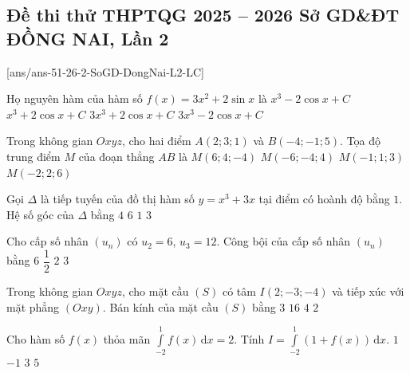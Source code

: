 \subsection*{Đề thi thử THPTQG 2025 -- 2026 Sở GD\&ĐT ĐỒNG NAI, Lần 2}
\caulc
{}[ans/ans-51-26-2-SoGD-DongNai-L2-LC]
\begin{ex}%
	Họ nguyên hàm của hàm số $f(x)=3x^2+2\sin x$ là
	\choice
	{\True $x^3-2\cos x+C$}
	{$x^3+2\cos x+C$}
	{$3x^3+2\cos x+C$}
	{$3x^3-2\cos x+C$}
\end{ex}

\begin{ex}%
	Trong không gian $Oxyz$, cho hai điểm $A(2;3;1)$ và $B(-4;-1;5)$. Tọa độ trung điểm $M$ của đoạn thẳng $AB$ là
	\choice
	{$M(6;4;-4)$}
	{$M(-6;-4;4)$}
	{\True  $M(-1;1;3)$}
	{$M(-2;2;6)$}
\end{ex}

\begin{ex}%
	Gọi $\Delta$ là tiếp tuyến của đồ thị hàm số $y=x^3+3x$ tại điểm có hoành độ bằng $1$. Hệ số góc của $\Delta$ bằng
	\choice
	{$4$}
	{\True $6$}
	{$1$}
	{$3$}
\end{ex}

\begin{ex}%
	Cho cấp số nhân $(u_n)$ có $u_2=6$, $u_3=12$. Công bội của cấp số nhân $(u_n)$ bằng
	\choice
	{$6$}
	{$\dfrac{1}{2}$}
	{\True  $2$}
	{$3$}
\end{ex}

\begin{ex}%
	Trong không gian $Oxyz$, cho mặt cầu $(S)$ có tâm $I(2;-3;-4)$ và tiếp xúc với mặt phẳng $(Oxy)$. Bán kính của mặt cầu $(S)$ bằng
	\choice
	{$3$}
	{$16$}
	{\True $4$}
	{$2$}
\end{ex}

\begin{ex}%
	Cho hàm số $f(x)$ thỏa mãn $\displaystyle \int\limits_{-2}^{1}f(x)\mathrm{\,d} x=2$. Tính $\displaystyle I = \int\limits_{-2}^1 (1+f(x))\mathrm{\,d} x$.
	\choice
	{$1$}
	{$-1$}
	{$3$}
	{\True $5$}
\end{ex}

